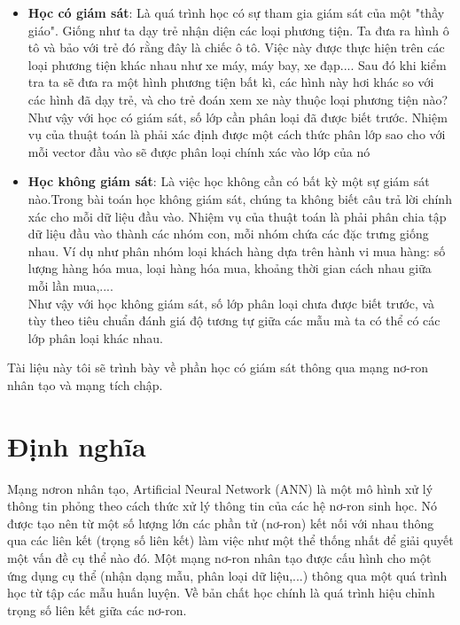\begin{itemize}
	\item \textbf{Học có giám sát}: Là quá trình học có sự tham gia giám sát của một "thầy giáo". Giống như ta dạy trẻ nhận diện các loại phương tiện. Ta đưa ra hình ô tô và bảo với trẻ đó rằng đây là chiếc ô tô. Việc này được thực hiện trên các loại phương tiện khác nhau như xe máy, máy bay, xe đạp.... Sau đó khi kiểm tra ta sẽ đưa ra một hình phương tiện bất kì, các hình này hơi khác so với các hình đã dạy trẻ, và cho trẻ đoán xem xe này thuộc loại phương tiện nào?\\
	Như vậy với học có giám sát, số lớp cần phân loại đã được biết trước. Nhiệm vụ của thuật toán là phải xác định được một cách thức phân lớp sao cho với mỗi vector đầu vào sẽ được phân loại chính xác vào lớp của nó
	
	\item \textbf{Học không giám sát}: Là việc học không cần có bất kỳ một sự giám sát nào.Trong bài toán học không giám sát, chúng ta không biết câu trả lời chính xác cho mỗi dữ liệu đầu vào. Nhiệm vụ của thuật toán là phải phân chia tập dữ liệu đầu vào thành các nhóm con, mỗi nhóm chứa các đặc trưng giống nhau. Ví dụ như phân nhóm loại khách hàng dựa trên hành vi mua hàng: số lượng hàng hóa mua, loại hàng hóa mua, khoảng thời gian cách nhau giữa mỗi lần mua,....\\
	 Như vậy với học không giám sát, số lớp phân loại chưa được biết trước, và tùy theo tiêu chuẩn đánh giá độ tương tự giữa các mẫu mà ta có thể có các lớp phân loại khác nhau.

\end{itemize}
Tài liệu này tôi sẽ trình bày về phần học có giám sát thông qua mạng nơ-ron nhân tạo và mạng tích chập.

\section{Định nghĩa}
Mạng nơron nhân tạo, Artificial Neural Network (ANN) là một mô hình xử lý thông tin phỏng theo cách thức xử lý thông tin của các hệ nơ-ron sinh học. Nó được tạo nên từ một số lượng lớn các phần tử (nơ-ron) kết nối với nhau thông qua các liên kết (trọng số liên kết) làm việc như một thể thống nhất để giải quyết một vấn đề cụ thể nào đó. Một mạng nơ-ron nhân tạo được cấu hình cho một ứng dụng cụ thể (nhận dạng mẫu, phân loại dữ liệu,...) thông qua một quá trình học từ tập các mẫu huấn luyện. Về bản chất học chính là quá trình hiệu chỉnh trọng số liên kết giữa các nơ-ron.

